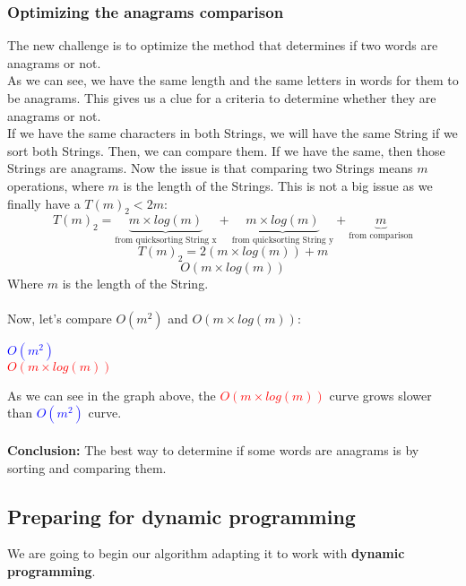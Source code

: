 \documentclass{article}
\begin{document}
	\subsubsection{Optimizing the anagrams comparison}
	The new challenge is to optimize the method that determines if two
	words are anagrams or not.
	\\
	As we can see, we have the same length and the same letters in words
	for them to be anagrams. This gives us a clue for a criteria to determine
	whether they are anagrams or not.
	\\
	If we have the same characters in both Strings, we will have the same String
	if we sort both Strings. Then, we can compare them. If we have the same, then
	those Strings are anagrams. Now the issue is that comparing two Strings means
	$m$ operations, where $m$ is the length of the Strings. This is not a big
	issue as we finally have a $T(m)_2 < 2m$:
	\[
	T(m)_2 = \underbrace{m \times log(m)}_\text{from quicksorting String x} + \underbrace{m \times log(m)}_\text{from quicksorting String y} + \underbrace{m}_\text{from comparison}
	\]
	\[
	T(m)_2 = 2(m \times log(m)) + m
	\]
	\[
	O(m \times log(m))
	\]
	Where $m$ is the length of the String.
	\\
	\\
	Now, let's compare $O(m^2)$ and $O(m \times log(m))$:
	\\
	\begin{center}
		\textcolor{blue}{$O(m^2)$}
		\\
		\textcolor{red}{$O(m \times log(m))$}
		\\
	\end{center}
	As we can see in the graph above, the \textcolor{red}{$O(m \times log(m))$} curve grows
	slower than \textcolor{blue}{$O(m^2)$} curve.
	\\
	\\
	\textbf{Conclusion:} The best way to determine if some words are anagrams
	is by sorting and comparing them.
	\subsection{Preparing for dynamic programming}
	We are going to begin our algorithm adapting it to work
	with \textbf{dynamic programming}.
\end{document}
